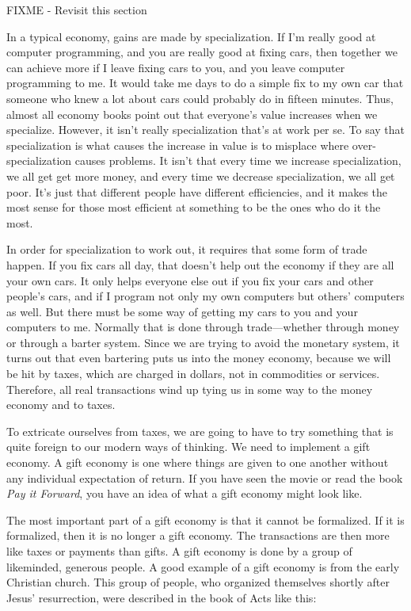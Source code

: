 FIXME - Revisit this section

In a typical economy, gains are made by specialization. If I’m really
good at computer programming, and you are really good at fixing cars,
then together we can achieve more if I leave fixing cars to you, and
you leave computer programming to me. It would take me days to do a
simple fix to my own car that someone who knew a lot about cars could
probably do in fifteen minutes. Thus, almost all economy books point
out that everyone’s value increases when we specialize. However, it
isn’t really specialization that’s at work per se. To say that
specialization is what causes the increase in value is to misplace
where over-specialization causes problems. It isn’t that every time we
increase specialization,
we all get
get more money, and
every time we decrease specialization, we all get poor. It’s just that
different people have different efficiencies, and it makes the most
sense for those most efficient at something to be the ones who do it
the most.

In order for specialization to work out, it requires that some form of
trade happen. If you fix cars all day, that doesn’t help out the
economy if they are all your own cars. It only helps everyone else out
if you fix your cars and other people’s cars, and if I program not only
my own computers but others’ computers as well. But there must be some
way of getting my cars to you and your computers to me. Normally that
is done through trade—whether through money or through a barter system.
Since we are trying to avoid the monetary system, it turns out that
even bartering puts us into the money economy, because we will be hit
by taxes, which are charged in dollars, not in commodities or services.
Therefore, all real transactions wind up tying us in some way to the
money economy and to taxes.

To extricate ourselves from taxes, we are going to have to try something
that is quite foreign to our modern ways of thinking. We need to
implement a gift economy. A gift economy is one where things are given
to one another without any individual expectation of return. If you
have seen the movie or read the book \textit{Pay it Forward}, you have
an idea of what a gift economy might look like.

The most important part of a gift economy is that it cannot be
formalized. If it is formalized, then it is no longer a gift economy.
The transactions are then more like taxes or payments than gifts. A
gift economy is done by a group of likeminded, generous people. A good
example of a gift economy is from the early Christian church. This
group of people, who organized themselves shortly after Jesus’
resurrection, were described in the book of Acts like this:

